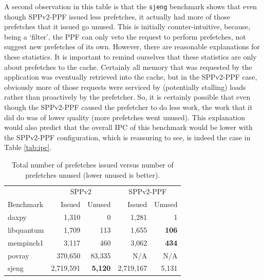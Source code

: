 \documentclass[10pt,conference]{IEEEtran}
\begin{document}
A second observation in this table is that the \texttt{sjeng} benchmark shows that even though SPPv2-PPF issued less prefetches, it actually had more of those prefetches that it issued go unused. This is initially counter-intuitive, because, being a `filter', the PPF can only veto the request to perform prefetches, not suggest new prefetches of its own. However, there are reasonable explanations for these statistics. It is important to remind ourselves that these statistics are only about prefetches to the cache. Certainly all memory that was requested by the application was eventually retrieved into the cache, but in the SPPv2-PPF case, obviously more of those requests were serviced by (potentially stalling) loads rather than proactively by the prefetcher. So, it is certainly possible that even though the SPPv2-PPF caused the prefetcher to do less work, the work that it did do was of lower quality (more prefetches went unused). This explanation would also predict that the overall IPC of this benchmark would be lower with the SPPv2-PPF configuration, which is reassuring to see, is indeed the case in Table \ref{tab:ipc}.

\begin{table}[ht]
\caption{Total number of prefetches issued versus number of prefetches unused (lower unused is better).}
\centering
\begin{tabular}{l|rr|rr}
&  \multicolumn{2}{c|}{SPPv2} & \multicolumn{2}{c}{SPPv2-PPF} \\
Benchmark &  Issued &      Unused &  Issued & Unused \\
\hline
daxpy      &     1,310 &   0 &     1,281  & 1\\
libquantum &     1,709 & 113 &     1,655 & \textbf{106} \\
mempinch1  &     3,117 & 460 &    3,062 & \textbf{434} \\
povray     &   370,650 & 83,335 &      N/A & N/A \\
sjeng      & 2,719,591 & \textbf{5,120} & 2,719,167 & 5,131 \\
\end{tabular}
\label{tab:pref}
\end{table}
\end{document}
